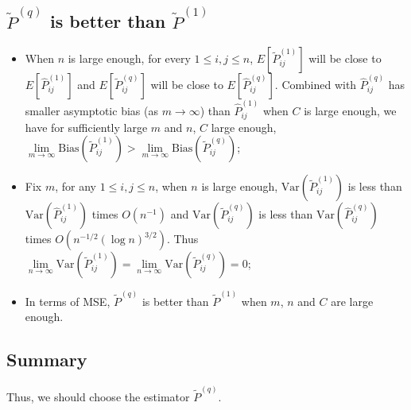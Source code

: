\documentclass[a4paper]{article}
\begin{document}
\subsection{$\widetilde{P}^{(q)}$ is better than $\widetilde{P}^{(1)}$}
\begin{itemize}
	\item When $n$ is large enough, for every $1 \le i,j \le n$, $E[\widetilde{P}_{ij}^{(1)}]$ will be close to $E[\hat{P}_{ij}^{(1)}]$ and $E[\widetilde{P}_{ij}^{(q)}]$ will be close to $E[\hat{P}_{ij}^{(q)}]$. Combined with $\hat{P}_{ij}^{(q)}$ has smaller asymptotic bias (as $m \to \infty$) than $\hat{P}_{ij}^{(1)}$ when $C$ is large enough, we have for sufficiently large $m$ and $n$, $C$ large enough, $\underset{m \to \infty}{\lim} \mathrm{Bias}(\widetilde{P}_{ij}^{(1)}) > \underset{m \to \infty}{\lim} \mathrm{Bias}(\widetilde{P}_{ij}^{(q)})$;
    \item Fix $m$, for any $1 \le i,j \le n$, when $n$ is large enough, $\mathrm{Var}(\widetilde{P}_{ij}^{(1)})$ is less than $\mathrm{Var}(\hat{P}_{ij}^{(1)})$ times $O(n^{-1})$ and $\mathrm{Var}(\widetilde{P}_{ij}^{(q)})$ is less than $\mathrm{Var}(\hat{P}_{ij}^{(q)})$ times $O(n^{-1/2} (\log n)^{3/2})$. Thus $\underset{n \to \infty}{\lim} \mathrm{Var}(\widetilde{P}_{ij}^{(1)}) = \underset{n \to \infty}{\lim} \mathrm{Var}(\widetilde{P}_{ij}^{(q)}) = 0$;
    \item In terms of MSE, $\widetilde{P}^{(q)}$ is better than $\widetilde{P}^{(1)}$ when $m$, $n$ and $C$ are large enough.
\end{itemize}




\subsection{Summary}
Thus, we should choose the estimator $\widetilde{P}^{(q)}$.
\end{document}
